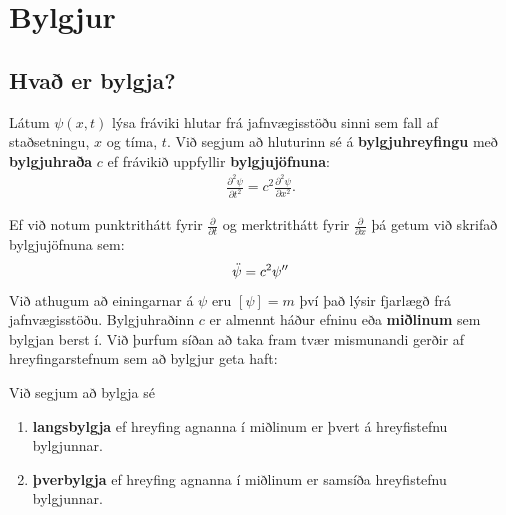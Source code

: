 \ifdefined \wholebook \else\documentclass[oneside]{book}\usepackage{EdlBook}\graphicspath{{figures/}}
\begin{document}
%
\setcounter{chapter}{11} %
%
\fi

\renewcommand{\thefigure}{\arabic{figure}}

\chapter{Bylgjur}

\section{Hvað er bylgja?}

\begin{tcolorbox}
\begin{definition}
Látum $\psi(x,t)$ lýsa fráviki hlutar frá jafnvægisstöðu sinni sem fall af staðsetningu, $x$ og tíma, $t$. Við segjum að hluturinn sé á \textbf{bylgjuhreyfingu} með \textbf{bylgjuhraða} $c$ ef frávikið uppfyllir \textbf{bylgjujöfnuna}:
\begin{align*}
    \frac{\partial^2\psi}{\partial t^2} = c^2 \frac{\partial^2 \psi}{\partial x^2}.
\end{align*}
\end{definition}
\end{tcolorbox}

Ef við notum punktrithátt fyrir $\frac{\partial}{\partial t}$ og merktrithátt fyrir $\frac{\partial}{\partial x}$ þá getum við skrifað bylgjujöfnuna sem:
\begin{align*}
    \Ddot{\psi} = c^2 \psi''
\end{align*}
Við athugum að einingarnar á $\psi$ eru $\left[ \psi \right] = \si{m}$ því það lýsir fjarlægð frá jafnvægisstöðu. Bylgjuhraðinn $c$ er almennt háður efninu eða \textbf{miðlinum} sem bylgjan berst í. Við þurfum síðan að taka fram tvær mismunandi gerðir af hreyfingarstefnum sem að bylgjur geta haft:

\begin{tcolorbox}
\begin{definition}
Við segjum að bylgja sé
\begin{enumerate}[label = \textbf{(\roman*)}]
    \item \textbf{langsbylgja} ef hreyfing agnanna í miðlinum er þvert á hreyfistefnu bylgjunnar.
    \item \textbf{þverbylgja} ef hreyfing agnanna í miðlinum er samsíða hreyfistefnu bylgjunnar.
\end{enumerate}
\end{definition}
\end{tcolorbox}
\end{document}
